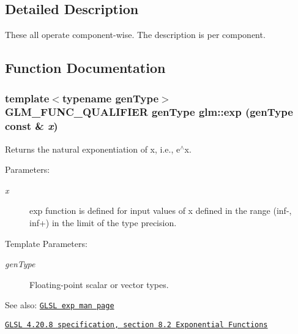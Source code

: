 \subsection{Detailed Description}
These all operate component-wise. The description is per component. 

\subsection{Function Documentation}
\hypertarget{group__core__func__exponential_g0e7e69c5497cbbfe4afe08ee5449c553}{
\subsubsection[exp]{\setlength{\rightskip}{0pt plus 5cm}template$<$typename genType$>$ GLM\_\-FUNC\_\-QUALIFIER genType glm::exp (genType const \& {\em x})}}
\label{group__core__func__exponential_g0e7e69c5497cbbfe4afe08ee5449c553}


Returns the natural exponentiation of x, i.e., e$^\wedge$x.

\begin{Desc}
\item[Parameters:]
\begin{description}
\item[{\em x}]exp function is defined for input values of x defined in the range (inf-, inf+) in the limit of the type precision. \end{description}
\end{Desc}
\begin{Desc}
\item[Template Parameters:]
\begin{description}
\item[{\em genType}]Floating-point scalar or vector types.\end{description}
\end{Desc}
\begin{Desc}
\item[See also:]\href{http://www.opengl.org/sdk/docs/manglsl/xhtml/exp.xml}{\tt GLSL exp man page} 

\href{http://www.opengl.org/registry/doc/GLSLangSpec.4.20.8.pdf}{\tt GLSL 4.20.8 specification, section 8.2 Exponential Functions} \end{Desc}


